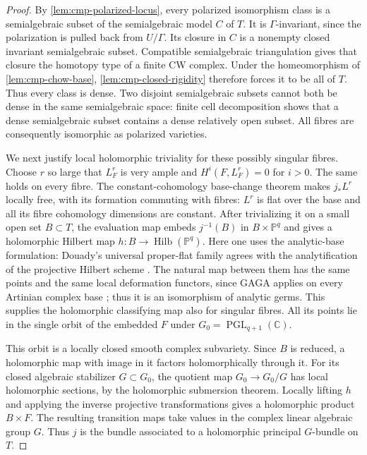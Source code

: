 \begin{proof}
By \cref{lem:cmp-polarized-locus}, every polarized isomorphism class is a semialgebraic subset of the semialgebraic model $C$ of $T$. It is $\Gamma$-invariant, since the polarization is pulled back from $U/\Gamma$.  Its closure in $C$ is a nonempty closed invariant semialgebraic subset.  Compatible semialgebraic triangulation \cite[\S3, Theorem~4]{Lojasiewicz1964} gives that closure the homotopy type of a finite CW complex.  Under the homeomorphism of \cref{lem:cmp-chow-base}, \cref{lem:cmp-closed-rigidity} therefore forces it to be all of $T$.  Thus every class is dense.  Two disjoint semialgebraic subsets cannot both be dense in the same semialgebraic space: finite cell decomposition shows that a dense semialgebraic subset contains a dense relatively open subset.  All fibres are consequently isomorphic as polarized varieties.

We next justify local holomorphic triviality for these possibly singular fibres.  Choose $r$ so large that $L_F^r$ is very ample and $H^i(F,L_F^r)=0$ for $i>0$.  The same holds on every fibre.  The constant-cohomology base-change theorem \cite[\S7, Satz~5]{Grauert1960} makes $j_*L^r$ locally free, with its formation commuting with fibres: $L^r$ is flat over the base and all its fibre cohomology dimensions are constant.  After trivializing it on a small open set $B\subset T$, the evaluation map embeds $j^{-1}(B)$ in $B\times\mathbb{P}^q$ and gives a holomorphic Hilbert map $h:B\to\operatorname{Hilb}(\mathbb{P}^q)$. Here one uses the analytic-base formulation: Douady's universal proper-flat family \cite[\S\S9.7--9.8, Theorems~1--2]{Douady1966} agrees with the analytification of the projective Hilbert scheme \cite[\S3, Theorem~3.2]{Grothendieck1961}. The natural map between them has the same points and the same local deformation functors, since GAGA applies on every Artinian complex base \cite[Expos\'e~XII, Theorem~4.4]{SGA1}; thus it is an isomorphism of analytic germs. This supplies the holomorphic classifying map also for singular fibres.  All its points lie in the single orbit of the embedded $F$ under $G_0=\operatorname{PGL}_{q+1}(\mathbb{C})$.

This orbit is a locally closed smooth complex subvariety.  Since $B$ is reduced, a holomorphic map with image in it factors holomorphically through it.  For its closed algebraic stabilizer $G\subset G_0$, the quotient map $G_0\to G_0/G$ has local holomorphic sections, by the holomorphic submersion theorem. Locally lifting $h$ and applying the inverse projective transformations gives a holomorphic product $B\times F$. The resulting transition maps take values in the complex linear algebraic group $G$.  Thus $j$ is the bundle associated to a holomorphic principal $G$-bundle on $T$.


\end{proof}

